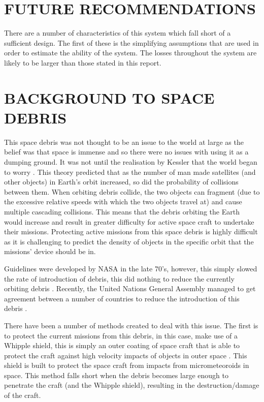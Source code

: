 \documentclass[11pt]{witseiepaper}
\begin{document}
\begin{bibunit}[witseie]
\newpage

\section{FUTURE RECOMMENDATIONS} \label{sec:FutureRecommendations}
There are a number of characteristics of this system which fall short of a sufficient design.
The first of these is the simplifying assumptions that are used in order to estimate the ability of the system. The losses throughout the system are likely to be larger than those stated in this report. 


\section{BACKGROUND TO SPACE DEBRIS} \label{sec:BackgroundToSpaceDebris}

This space debris was not thought to be an issue to the world at large as the belief was that space is immense and so there were no issues with using it as a dumping ground. It was not until the realisation by Kessler that the world began to worry \cite{Kessler}. This theory predicted that as the number of man made satellites (and other objects) in Earth's orbit increased, so did the probability of collisions between them. When orbiting debris collide, the two objects can fragment (due to the excessive relative speeds with which the two objects travel at) and cause multiple cascading collisions. This means that the debris orbiting the Earth would increase and result in greater difficulty for active space craft to undertake their missions.
Protecting active missions from this space debris is highly difficult as it is challenging to predict the density of objects in the specific orbit that the missions' device should be in.

Guidelines were developed by NASA in the late 70's, however, this simply slowed the rate of introduction of debris, this did nothing to reduce the currently orbiting debris \cite{spaceDebrisGuide}. Recently, the United Nations General Assembly managed to get agreement between a number of countries to reduce the introduction of this debris \cite{debrisGuidelinesAgreement}.

There have been a number of methods created to deal with this issue. The first is to protect the current missions from this debris, in this case, make use of a Whipple shield, this is simply an outer coating of space craft that is able to protect the craft against high velocity impacts of objects in outer space \cite{Whipple}. This shield is built to protect the space craft from impacts from micrometeoroids in space.
This method falls short when the debris becomes large enough to penetrate the craft (and the Whipple shield), resulting in the destruction/damage of the craft.


\end{bibunit}
\end{document}

